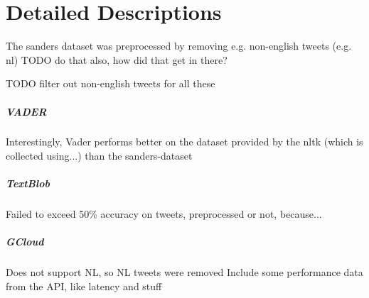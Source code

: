 \chapter{Detailed Descriptions}
\label{chapter:DetailedDescriptions}\label{sentimentanalysis}

The sanders dataset was preprocessed by removing e.g. non-english tweets (e.g. nl)
TODO do that
also, how did that get in there?


TODO filter out non-english tweets for all these

\paragraph{VADER}
Interestingly, Vader performs better on the dataset provided by the nltk (which is collected using...) than the sanders-dataset

\paragraph{TextBlob}
Failed to exceed 50\% accuracy on tweets, preprocessed or not, because...

\paragraph{GCloud}
Does not support NL, so NL tweets were removed
Include some performance data from the API, like latency and stuff

\newpage
